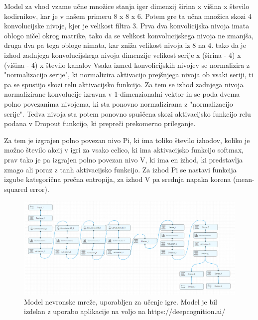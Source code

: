 \documentclass[a4paper, 12pt]{book}
\begin{document}
Model za vhod vzame učne množice stanja iger dimenzij širina x višina x število kodirnikov, kar je v našem primeru 8 x 8 x 6.
Potem gre ta učna množica skozi 4 konvolucijske nivoje, kjer je velikost filtra 3.
Prva dva konvolicijska nivoja imata oblogo ničel okrog matrike, tako da se velikost konvolucijskega nivoja ne zmanjša, druga dva pa tega obloge nimata, kar zniža velikost nivoja iz 8 na 4.
tako da je izhod zadnjega konvolucijskega nivoja dimenzije velikost serije  x (širina - 4) x (višina - 4) x število kanalov
Vsaka izmed konvolicijskih nivojev se normalizira z "normalizacijo serije", ki normalizira aktivacijo prejšnjega nivoja ob vsaki seriji, ti pa se spustijo skozi relu aktivacijsko funkcijo.
Za tem se izhod zadnjega nivoja normalizirane konvolucije izravna v 1-dimenzionalni vektor in se poda dvema polno povezanima nivojema, ki sta ponovno normalizirana z "normalizacijo serije".
Tedva nivoja sta potem ponovno spuščena skozi aktivacijsko funkcijo relu podana v  Dropout funkcijo, ki prepreči prekomerno prileganje.

Za tem je izgrajen polno povezan nivo Pi, ki ima toliko število izhodov, koliko je možno število akcij v igri za vsako celico, ki ima aktivacijsko funkcijo softmax,
prav tako je pa izgrajen polno povezan nivo V, ki ima en izhod, ki predstavlja zmago ali poraz z tanh aktivacijsko funkcijo.
Za izhod Pi se nastavi funkcija izgube kategorična prečna entropija, za izhod V pa srednja napaka korena (mean-squared error).

\begin{figure}[h]
	\begin{center}
		\includegraphics[width=1\textwidth]{model_using_deepcognition.pdf}
	\end{center}
	\caption{Model nevronske mreže, uporabljen za učenje igre. Model je bil izdelan z uporabo aplikacije na voljo na https://deepcognition.ai/}
	\label{vizualzacijaModela}
\end{figure}
\end{document}
